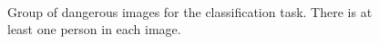 \begin{figure}
    \\
    \vspace{\subfigurevspacing}
    \hspace{\subfigurehspacing}
    \vspace{0.1cm}
    \caption[Group of dangerous images for the classification task]
    {Group of dangerous images for the classification task. There is at least one
    person in each image.}
    \label{fig:sub_safe_group}
\end{figure}

